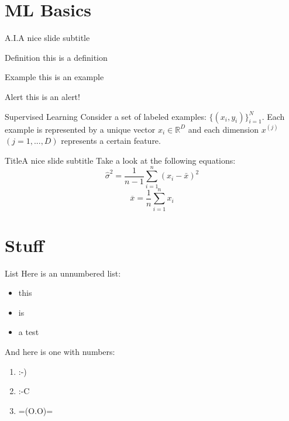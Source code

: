 \section{ML Basics}

\begin{frame}[t]{A.I.}{A nice slide subtitle} \vspace{5pt}
\begin{block}{Definition}
this is a definition 
\end{block}
\begin{exampleblock}{Example} 
this is an example 
\end{exampleblock}
\begin{alertblock}{Alert}
this is an alert!
\end{alertblock}
\end{frame}

\begin{frame}[t]{Supervised Learning}\vspace{5pt}
Consider a set of labeled examples: $ \{ (x_i, y_i) \} ^N_{i=1}$. Each example is represented by a unique vector $x_i \in \mathbb{R}^D $ and each dimension  $x^{(j)}$ $(j = 1, ..., D)$ represents a certain feature.
\end{frame}

\begin{frame}[t]{Title}{A nice slide subtitle}\vspace{5pt}
Take a look at the following equations:
\begin{equation}
    \hat{\sigma}^2 = \frac{1}{n-1}\sum^n_{i=1}(x_i - \bar{x})^2
\end{equation}
\begin{equation}
    \overline{x} = \frac{1}{n}\sum^n_{i=1}x_i
\end{equation}
\end{frame}

\section{Stuff}

\begin{frame}[t]{List}\vspace{5pt}
Here is an unnumbered list:
\begin{itemize}
    \item this
    \item is
    \item a test
\end{itemize}
And here is one with numbers:
\begin{enumerate}
    \item :-)
    \item :-C 
    \item =(O.O)=
\end{enumerate}
\end{frame}

